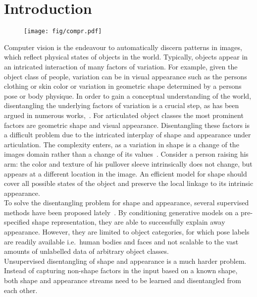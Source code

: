 \section{Introduction}
\begin{figure}\label{fig:firstpage}
	\centering
	\texttt{[image: fig/compr.pdf]}
\end{figure}
Computer vision is the endeavour to automatically discern patterns in images, which reflect physical states of objects in the world.
Typically, objects appear in an intricated interaction of many factors of variation.
For example, given the object class of people, variation can be in visual appearance such as the persons clothing or skin color or variation in geometric shape determined by a persons pose or body physique.
%
In order to gain a conceptual understanding of the world, disentangling the underlying factors of variation is a crucial step, as has been argued in numerous works,~\cite{Desjardins2012dr, Bengio2013rep, Chen2016infogan, Higgins2016betavae, Eastwood2018dr}.
%
For articulated object classes the most prominent factors are geometric shape and visual appearance.
Disentangling these factors is a difficult problem due to the intricated interplay of shape and appearance under articulation.
The complexity enters, as a variation in shape is a change of the images domain rather than a change of its values~\cite{Shu:2018ua}.
Consider a person raising his arm: the color and texture of his pullover sleeve intrinsically does not change, but appears at a different location in the image. An efficient model for shape should cover all possible states of the object and preserve the local linkage to its intrinsic appearance.
\\
%
To solve the disentangling problem for shape and appearance, several supervised methods have been proposed lately~\cite{Esser:2018ue, Ma:2017wq, Ma:2017uu, deBem:2018wp, Siarohin:2018wk, Balakrishnan:2018wo}.
By conditioning generative models on a pre-specified shape representation, they are able to successfully explain away appearance.
However, they are limited to object categories, for which pose labels are readily available i.e.\ human bodies and faces and not scalable to the vast amounts of unlabelled data of arbitrary object classes.\\
%
Unsupervised disentangling of shape and appearance is a much harder problem.
Instead of capturing non-shape factors in the input based on a known shape, both shape and appearance streams need to be learned and disentangled from each other.

